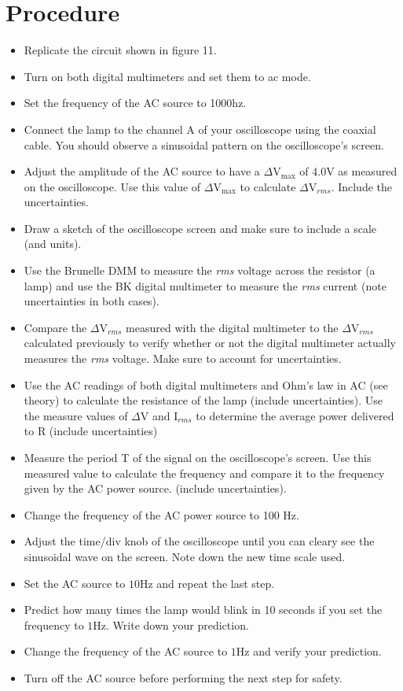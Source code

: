 \documentclass{report}
\begin{document}
\section{Procedure}
\begin{itemize}[label=\textbullet]
    \item Replicate the circuit shown in figure 11.
    \item Turn on both digital multimeters and set them to ac mode.
    \item Set the frequency of the AC source to 1000hz.
    \item Connect the lamp to the channel A of your oscilloscope using the coaxial cable. You should observe a sinusoidal pattern on the oscilloscope’s screen.
    \item Adjust the amplitude of the AC source to have a $\Delta\si{\volt}_{\max}$ of 4.0$\si{\volt}$ as measured on the oscilloscope.  Use this value of $\Delta\si{\volt}_{\max}$ to calculate $\Delta\si{\volt}_{rms}$. Include the uncertainties.
    \item Draw a sketch of the oscilloscope screen and make sure to include a scale (and units).
    \item Use the Brunelle DMM to measure the \textit{rms} voltage across the resistor (a lamp) and use the BK digital multimeter to measure the \textit{rms} current (note uncertainties in both cases).
    \item Compare the $\Delta\si{\volt}_{rms}$  measured with the digital multimeter to the $\Delta\si{\volt}_{rms}$  calculated previously to verify whether or not the digital multimeter actually measures the \textit{rms} voltage. Make sure to account for uncertainties.
    \item Use the AC readings of both digital multimeters and Ohm’s law in AC (see theory) to calculate the resistance of the lamp (include uncertainties). Use the measure values of $\Delta\si{\volt}$ and I$_{rms}$ to determine the average power delivered to R (include uncertainties)
    \item Measure the period T of the signal on the oscilloscope’s screen. Use this measured value to calculate the frequency and compare it to the frequency given by the AC power source. (include uncertainties).
    \item Change the frequency of the AC power source to 100 $\si{\hertz}$.
    \item Adjust the time/div knob of the oscilloscope until you can cleary see the sinusoidal wave on the screen. Note down the new time scale used.
    \item Set the AC source to $10\si{\hertz}$ and repeat the last step.
    \item Predict how many times the lamp would blink in 10 seconds if you set the frequency to $1\si{\hertz}$. Write down your prediction.
    \item Change the frequency of the AC source to $1\si{\hertz}$ and verify your prediction.
    \item Turn off the AC source before performing the next step for safety.
\end{itemize}
\end{document}
